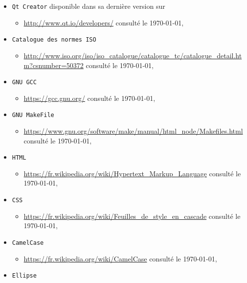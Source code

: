 \documentclass[a4paper,11pt]{report}
\begin{document}
\begin{itemize}
\begin{itemize}
		\end{itemize}
	\item[] \texttt{Qt Creator} disponible dans sa dernière version sur 
		\begin{itemize}
			\item \url{http://www.qt.io/developers/} consulté le \today,\\
		\end{itemize}
	\item[] \texttt{Catalogue des normes ISO} 
		\begin{itemize}
			\item \url{http://www.iso.org/iso/iso_catalogue/catalogue_tc/catalogue_detail.htm?csnumber=50372}
				consulté le \today,\\
		\end{itemize}
	\item[] \texttt{GNU GCC} 
		\begin{itemize}
			\item \url{https://gcc.gnu.org/} consulté le \today,\\
		\end{itemize}
	\item[] \texttt{GNU MakeFile} 
		\begin{itemize}
			\item \url{https://www.gnu.org/software/make/manual/html_node/Makefiles.html} consulté le \today, \\
		\end{itemize}
	\item[] \texttt{HTML} 
		\begin{itemize}
			\item \url{https://fr.wikipedia.org/wiki/Hypertext_Markup_Language} consulté le \today,\\
		\end{itemize}
	\item[] \texttt{CSS} 
		\begin{itemize}
			\item \url{https://fr.wikipedia.org/wiki/Feuilles_de_style_en_cascade} consulté le \today,\\
		\end{itemize}
	\item[] \texttt{CamelCase} 
		\begin{itemize}
			\item \url{https://fr.wikipedia.org/wiki/CamelCase} consulté le \today,\\
		\end{itemize}
	\item[] \texttt{Ellipse}

\end{itemize}
\end{document}

